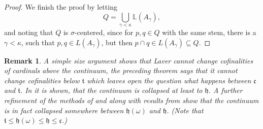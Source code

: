 \documentclass[a4paper,11pt,oneside]{mybook}
\theoremstyle{theorem}
\newtheorem{remark}[subsection]{Remark}
\theoremstyle{example}
\begin{document}
\begin{proof}
 We finish the proof by letting
  $$Q=\bigcup_{\gamma<\kappa} \mathbb{L}(A_\gamma),$$
 and noting that $Q$ is $\sigma$-centered, since for $p,q\in Q$ with the same stem, there is a $\gamma<\kappa$, such that $p,q\in L(A_\gamma)$, but then
 $p\cap q\in L(A_\gamma)\subseteq Q$.
 \end{proof}
 \begin{remark}
  A simple size argument shows that Laver cannot change cofinalities of cardinals above the continuum, the preceding theorem says that it cannot change
 cofinalities below $\mathfrak{t}$ which leaves open the question what happens between $\mathfrak{c}$ and $\mathfrak{t}$. In \cite{tree-ideals} it is shown, that the
 continuum is collapsed at least to $\mathfrak{h}$. A further refinement of the methods of \cite{tree-ideals} and \cite{towers-on-trees} along with results from
 \cite{distrib-numbers} show that the continuum is in fact collapsed somewhere between $\mathfrak{h}(\omega)$ and $\mathfrak{h}$. (Note that
 $\mathfrak{t}\leq\mathfrak{h}(\omega)\leq\mathfrak{h}\leq\mathfrak{c}$.)
 \end{remark}
 
\end{document}
